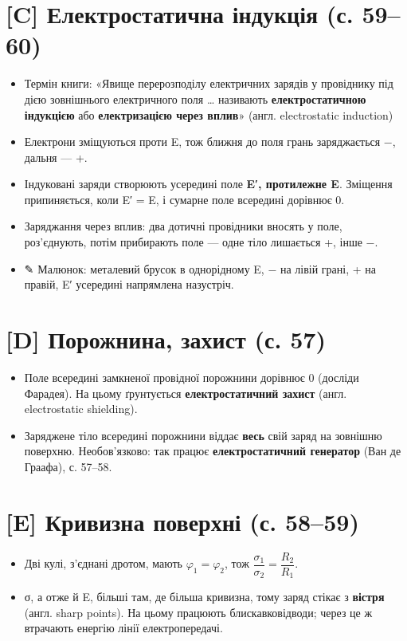 \documentclass[11pt,a4paper,oneside]{book}
\newcommand{\pen}{{\sffamily\color{accent}✎}}
\begin{document}
\section*{[C] Електростатична індукція (с. 59–60)}
\begin{itemize}
\item Термін книги: «Явище перерозподілу електричних зарядів у провіднику під дією зовнішнього електричного поля … називають \textbf{електростатичною індукцією} або \textbf{електризацією через вплив}» (англ. electrostatic induction)
\item Електрони зміщуються проти E, тож ближня до поля грань заряджається −, дальня — +.
\item Індуковані заряди створюють усередині поле \textbf{E′, протилежне E}. Зміщення припиняється, коли E′ = E, і сумарне поле всередині дорівнює 0.
\item Заряджання через вплив: два дотичні провідники вносять у поле, роз'єднують, потім прибирають поле — одне тіло лишається +, інше −.
\item \pen{} Малюнок: металевий брусок в однорідному E, − на лівій грані, + на правій, E′ усередині напрямлена назустріч.
\end{itemize}

\section*{[D] Порожнина, захист (с. 57)}
\begin{itemize}
\item Поле всередині замкненої провідної порожнини дорівнює 0 (досліди Фарадея). На цьому ґрунтується \textbf{електростатичний захист} (англ. electrostatic shielding).
\item Заряджене тіло всередині порожнини віддає \textbf{весь} свій заряд на зовнішню поверхню. Необов'язково: так працює \textbf{електростатичний генератор} (Ван де Граафа), с. 57–58.
\end{itemize}

\section*{[E] Кривизна поверхні (с. 58–59)}
\begin{itemize}
\item Дві кулі, з'єднані дротом, мають $\varphi_1=\varphi_2$, тож $\dfrac{\sigma_1}{\sigma_2} = \dfrac{R_2}{R_1}$.
\item σ, а отже й E, більші там, де більша кривизна, тому заряд стікає з \textbf{вістря} (англ. sharp points). На цьому працюють блискавковідводи; через це ж втрачають енергію лінії електропередачі.
\end{itemize}
\end{document}
